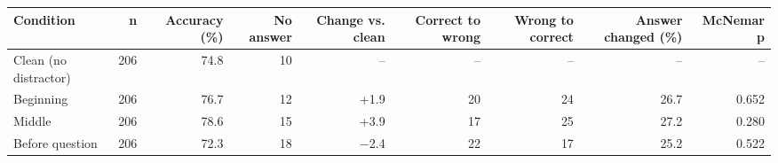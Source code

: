 \begin{tabular}{lrrrrrrrr}
\toprule
Condition & n & Accuracy (\%) & No answer & Change vs. clean & Correct to wrong & Wrong to correct & Answer changed (\%) & McNemar p \\
\midrule
Clean (no distractor) & 206 & 74.8 & 10 & -- & -- & -- & -- & -- \\
Beginning & 206 & 76.7 & 12 & +1.9 & 20 & 24 & 26.7 & 0.652 \\
Middle & 206 & 78.6 & 15 & +3.9 & 17 & 25 & 27.2 & 0.280 \\
Before question & 206 & 72.3 & 18 & $-$2.4 & 22 & 17 & 25.2 & 0.522 \\
\bottomrule
\end{tabular}
